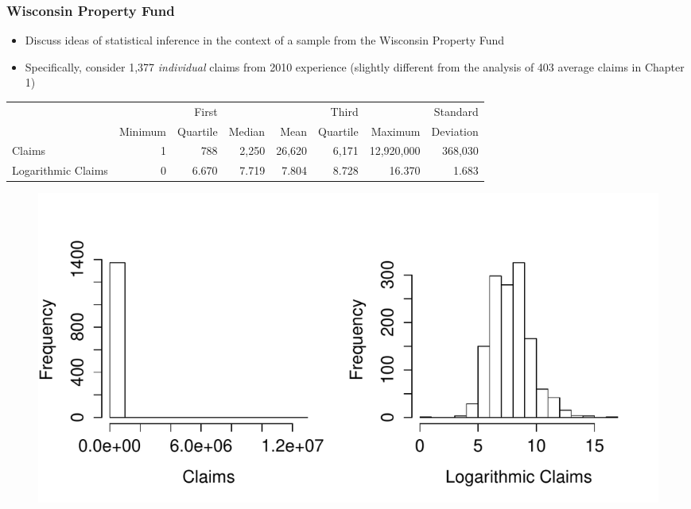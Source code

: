 \documentclass{beamer}
\begin{document}
\begin{frame}[shrink=2]
\frametitle{Wisconsin Property Fund}
\begin{itemize}
\item Discuss ideas of statistical inference in the context of a sample from the Wisconsin Property Fund
\item Specifically, consider 1,377 \textit{individual} claims from 2010 experience (slightly different from the analysis of 403 average claims in Chapter 1)
\end{itemize}
\vspace{-.15in}
\begin{table}[htbp]
  \centering
    \begin{tabular}{l|rrrrrrr}
    \hline
                   &        &First     &       &         &Third        &        &Standard\\
                   & Minimum& Quartile &Median &Mean     & Quartile    &Maximum &Deviation \\  \hline
Claims             &1       & 788      &2,250  & 26,620  &  6,171      & 12,920,000 &368,030\\
Logarithmic Claims & 0      & 6.670    & 7.719 & 7.804   & 8.728       & 16.370 & 1.683\\
    \hline
    \end{tabular}
 \end{table}

\vspace{-.2in}
\begin{figure}[htp]
\begin{center}
    \includegraphics[width=.7\textwidth]{Figures/Severity2.pdf}
\end{center}
\end{figure}
\end{frame}
\end{document}
